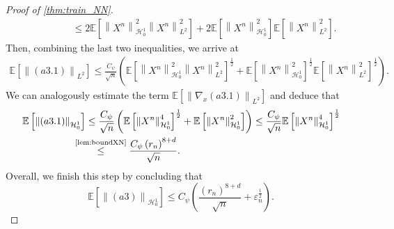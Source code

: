 \documentclass[11pt,a4paper,reqno]{amsart}
\numberwithin{equation}{section}
\theoremstyle{plain}
\theoremstyle{definition}
\def\e{{\varepsilon}}
\newcommand{\E}{\mathbb{E}}
\newcommand{\cH}{\mathcal{H}}
\newcommand{\norm}[1]{\left\|#1 \right\|} %
\begin{document}
\begin{proof}[Proof of \cref{thm:train_NN}]
\begin{align*}
    &\qquad\qquad \le 2 \E \left[ \norm{X^n}^2_{\cH_0^1} \norm{X^n}^2_{L^2} \right] + 2 \E \left[ \norm{X^n}^2_{\cH_0^1} \right] \E \left[ \norm{X^n}_{L^2}^2 \right].
\end{align*}
Then, combining the last two inequalities, we arrive at
\begin{align*}
\E\left[\norm{\left(a3.1\right)}_{L^2} \right] 
    \le \frac{C_\psi}{\sqrt{n}} \left( \E \left[ \norm{X^n}^2_{\cH_0^1} \norm{X^n}^2_{L^2} \right]^{\frac{1}{2}} + \E \left[ \norm{X^n}^2_{\cH_0^1} \right]^{\frac{1}{2}} \E \left[ \norm{X^n}^2_{L^2} \right]^{\frac{1}{2}} \right).
\end{align*}
We can analogously estimate the term $\E\left[\norm{\nabla_x\left(a3.1\right)}_{L^2} \right]$ and deduce that 
\begin{align*}
\E\left[\norm{\left(a3.1\right)}_{\cH_0^1}\right] 
    &\le \frac{C_\psi}{\sqrt{n}}\left( \E \left[ \norm{X^n}^4_{\cH_0^1} \right]^{\frac{1}{2}} + \E \left[ \norm{X^n}^2_{\cH_0^1} \right] \right) 
     \le \frac{C_\psi}{\sqrt{n}} \E \left[ \norm{X^n}^4_{\cH_0^1} \right]^{\frac{1}{2}} \\
    &\hspace{-1.35em}\overset{\text{\cref{lem:boundXN}}}{\le} \frac{C_\psi\left(r_n\right)^{8+d}}{\sqrt{n}}.
\end{align*}
Overall, we finish this step by concluding that 
\[
    \E\left[ \norm{\left(a3\right)}_{\cH_0^1} \right]\le C_\psi\left(  \frac{\left(r_n\right)^{8+d}}{\sqrt{n}}+\e_n^{\frac{1}{2}}\right).
\]


\end{proof}
\end{document}
